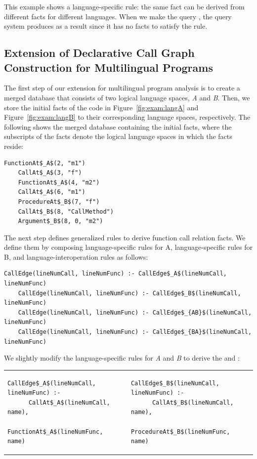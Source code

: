 \noindent
This example shows a language-specific rule:
the same fact  can be derived from different facts for
different languages. When we make the query ,
the query system produces  as a result
since it has no facts to satisfy the rule.

\subsection{Extension of Declarative Call Graph Construction for Multilingual Programs}
The first step of our extension for multilingual program analysis is to create a
merged database that consists of two logical language spaces, {\it A} and {\it
B}. Then, we store the initial facts of the code in Figure~\ref{fig:exam:langA} and
Figure~\ref{fig:exam:langB} to
their corresponding language spaces, respectively. The following shows the merged
database containing the initial facts, where the subscripts of the facts denote
the logical language spaces in which the facts reside: 

\begin{lstlisting}[style=mrule]
    FunctionAt$_A$(2, "m1")
    CallAt$_A$(3, "f")
    FunctionAt$_A$(4, "m2")
    CallAt$_A$(6, "m1")
    ProcedureAt$_B$(7, "f")
    CallAt$_B$(8, "CallMethod")
    Argument$_B$(8, 0, "m2")
\end{lstlisting}

The next step defines generalized rules to derive function call relation
facts. We define them by composing language-specific rules for A,
language-specific rules for B, and language-interoperation rules as follows:

\begin{lstlisting}[style=mrule]
    CallEdge(lineNumCall, lineNumFunc) :- CallEdge$_A$(lineNumCall, lineNumFunc)
    CallEdge(lineNumCall, lineNumFunc) :- CallEdge$_B$(lineNumCall, lineNumFunc)
    CallEdge(lineNumCall, lineNumFunc) :- CallEdge$_{AB}$(lineNumCall, lineNumFunc)
    CallEdge(lineNumCall, lineNumFunc) :- CallEdge$_{BA}$(lineNumCall, lineNumFunc)
\end{lstlisting}

\noindent 
We slightly modify the language-specific rules for {\it A} and {\it B} to
derive the  and :

\begin{tabular}{ll}
  {\begin{lstlisting}[style=mrule]
    CallEdge$_A$(lineNumCall, lineNumFunc) :-
      CallAt$_A$(lineNumCall, name),
      FunctionAt$_A$(lineNumFunc, name)
  \end{lstlisting}} & 
  {\begin{lstlisting}[style=mrule]
    CallEdge$_B$(lineNumCall, lineNumFunc) :-
      CallAt$_B$(lineNumCall, name),
      ProcedureAt$_B$(lineNumFunc, name)
  \end{lstlisting}}
\end{tabular}

